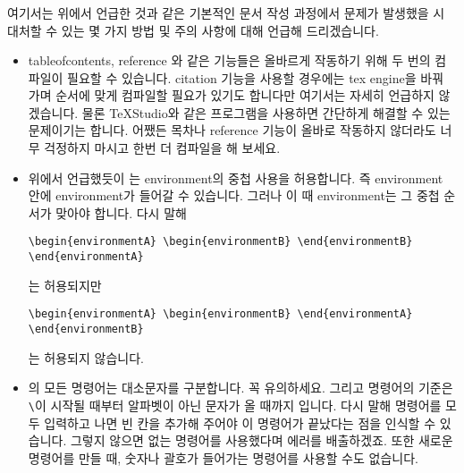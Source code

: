 \subsubsection*{}
여기서는 위에서 언급한 것과 같은 기본적인 문서 작성 과정에서 문제가 발생했을 시 대처할 수 있는 몇 가지 방법 및 주의 사항에 대해 언급해 드리겠습니다.
\begin{itemize}
\item tableofcontents, reference 와 같은 기능들은 올바르게 작동하기 위해 두 번의 컴파일이 필요할 수 있습니다. citation 기능을 사용할 경우에는 tex engine을 바꿔 가며 순서에 맞게 컴파일할 필요가 있기도 합니다만 여기서는 자세히 언급하지 않겠습니다. 물론 TeXStudio와 같은 프로그램을 사용하면 간단하게 해결할 수 있는 문제이기는 합니다. 어쨌든 목차나 reference 기능이 올바로 작동하지 않더라도 너무 걱정하지 마시고 한번 더 컴파일을 해 보세요.
\item 위에서 언급했듯이 \lt 는 environment의 중첩 사용을 허용합니다. 즉 environment 안에 environment가 들어갈 수 있습니다. 그러나 이 때 environment는 그 중첩 순서가 맞아야 합니다. 다시 말해
\begin{Verbatim}
\begin{environmentA} \begin{environmentB} \end{environmentB} \end{environmentA}
\end{Verbatim}
  는 허용되지만
\begin{Verbatim}
\begin{environmentA} \begin{environmentB} \end{environmentA} \end{environmentB}
\end{Verbatim}
  는 허용되지 않습니다.
\item \lt 의 모든 명령어는 대소문자를 구분합니다. 꼭 유의하세요. 그리고 명령어의 기준은 \verb|\|이 시작될 때부터 알파벳이 아닌 문자가 올 때까지 입니다. 다시 말해 명령어를 모두 입력하고 나면 빈 칸을 추가해 주어야 \lt 이 명령어가 끝났다는 점을 인식할 수 있습니다. 그렇지 않으면 없는 명령어를 사용했다며 에러를 배출하겠죠. 또한 새로운 명령어를 만들 때, 숫자나 괄호가 들어가는 명령어를 사용할 수도 없습니다.

\end{itemize}

